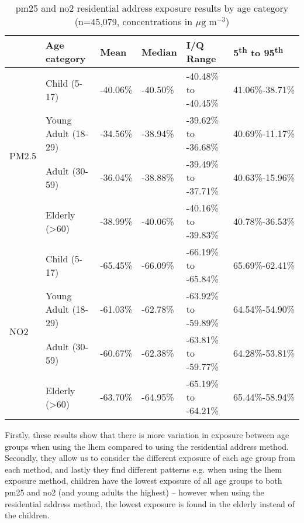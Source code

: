 \begin{table}[H]
\caption{\gls{pm25} and \gls{no2} residential address exposure results by age category (n=45,079, concentrations in $\mu \text{g m}^{-3}$)}
\centering
\begin{tabular}{|l|l|l|l|l|l|}
\hline
                       & \bfseries{Age category}  & \bfseries{Mean}  & \bfseries{Median} & \bfseries{I/Q Range} & \bfseries{5\textsuperscript{th} to 95\textsuperscript{th}} \\ \hline
\multirow{4}{*}{PM2.5} & Child (5-17)             & -40.06\% & -40.50\% & -40.48\% to -40.45\%    & 41.06\%-38.71\% \\ \cline{2-5} 
                       & Young Adult (18-29)      & -34.56\% & -38.94\% & -39.62\% to -36.68\%    & 40.69\%-11.17\% \\ \cline{2-5} 
                       & Adult (30-59)            & -36.04\% & -38.88\% & -39.49\% to -37.71\%    & 40.63\%-15.96\% \\ \cline{2-5} 
                       & Elderly (\textgreater60) & -38.99\% & -40.06\% & -40.16\% to -39.83\%    & 40.78\%-36.53\% \\ \hline
\multirow{4}{*}{NO2}   & Child (5-17)             & -65.45\% & -66.09\% & -66.19\% to -65.84\%    & 65.69\%-62.41\% \\ \cline{2-5} 
                       & Young Adult (18-29)      & -61.03\% & -62.78\% & -63.92\% to -59.89\%    & 64.54\%-54.90\% \\ \cline{2-5} 
                       & Adult (30-59)            & -60.67\% & -62.38\% & -63.81\% to -59.77\%    & 64.28\%-53.81\% \\ \cline{2-5} 
                       & Elderly (\textgreater60) & -63.70\% & -64.95\% & -65.19\% to -64.21\%    & 65.44\%-58.94\% \\ \hline
\end{tabular}
\label{tab:percent_change_comparing_age_categories}
\end{table}

Firstly, these results show that there is more variation in exposure between age groups when using the \gls{lhem} compared to using the residential address method. Secondly, they allow us to consider the different exposure of each age group from each method, and lastly they find different patterns e.g. when using the \gls{lhem} exposure method, children have the lowest exposure of all age groups to both \gls{pm25} and \gls{no2} (and young adults the highest) -- however when using the residential address method, the lowest exposure is found in the elderly instead of the children.

